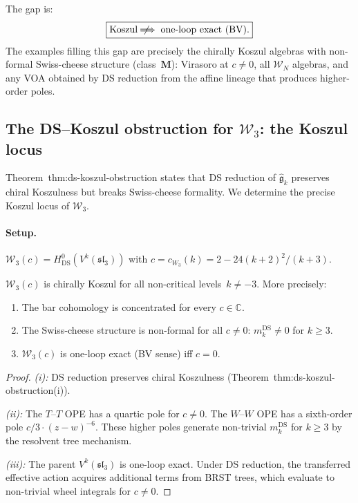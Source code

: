 \documentclass[11pt]{article}
\newcommand{\cW}{\mathcal{W}}
\newcommand{\fsl}{\mathfrak{sl}}
\newcommand{\C}{\mathbb{C}}
\begin{document}
\begin{remark}
The gap is:
\[
\boxed{
\text{Koszul} \;\not\!\!\Longrightarrow\;
\text{one-loop exact (BV)}.
}
\]
The examples filling this gap are precisely the chirally
Koszul algebras with non-formal Swiss-cheese structure
(class~$\mathbf{M}$): Virasoro at $c \neq 0$, all
$\cW_N$ algebras, and any VOA obtained by
DS reduction from the affine lineage that produces
higher-order poles.
\end{remark}

\subsection{The DS--Koszul obstruction for $\cW_3$:
the Koszul locus}
\label{subsec:ds-koszul-w3}

Theorem~thm:ds-koszul-obstruction states that
DS reduction of $\hat{\mathfrak{g}}_k$ preserves chiral
Koszulness but breaks Swiss-cheese formality.  We determine
the precise Koszul locus of $\cW_3$.

\paragraph{Setup.}
$\cW_3(c) = H^0_{\mathrm{DS}}(V^k(\fsl_3))$
with $c = c_{W_3}(k) = 2 - 24(k+2)^2/(k+3)$.

\begin{proposition}[The Koszul locus of $\cW_3$]
\label{prop:koszul-locus-W3}
$\cW_3(c)$ is chirally Koszul for all non-critical
levels~$k \neq -3$.  More precisely:
\begin{enumerate}[label=\textup{(\roman*)}]
\item The bar cohomology is concentrated for every $c \in \C$.
\item The Swiss-cheese structure is non-formal for
  all $c \neq 0$: $m_k^{\mathrm{DS}} \neq 0$ for $k \geq 3$.
\item $\cW_3(c)$ is one-loop exact (BV sense) iff $c = 0$.
\end{enumerate}
\end{proposition}

\begin{proof}
\emph{(i):}
DS reduction preserves chiral Koszulness
(Theorem~thm:ds-koszul-obstruction(i)).

\emph{(ii):}
The $T$--$T$ OPE has a quartic pole for $c \neq 0$.
The $W$--$W$ OPE has a sixth-order pole $c/3 \cdot (z-w)^{-6}$.
These higher poles generate non-trivial $m_k^{\mathrm{DS}}$
for $k \geq 3$ by the resolvent tree mechanism.

\emph{(iii):}
The parent $V^k(\fsl_3)$ is one-loop exact.
Under DS reduction, the transferred effective action acquires
additional terms from BRST trees, which evaluate to
non-trivial wheel integrals for $c \neq 0$.
\end{proof}
\end{document}
